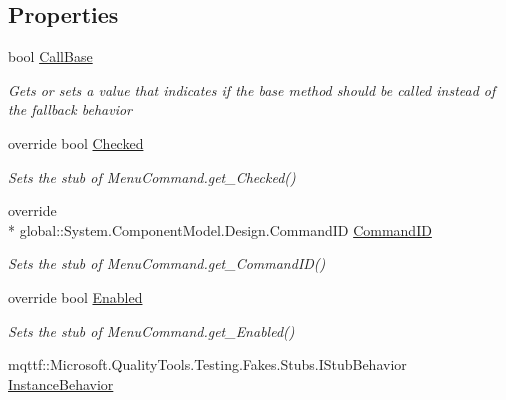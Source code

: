 \subsection*{Properties}
\begin{DoxyCompactItemize}
\item 
bool \hyperlink{class_system_1_1_component_model_1_1_design_1_1_fakes_1_1_stub_menu_command_af43b61c0740e5f5e114aba35d371b08c}{Call\-Base}
\begin{DoxyCompactList}\small\item\em Gets or sets a value that indicates if the base method should be called instead of the fallback behavior\end{DoxyCompactList}\item 
override bool \hyperlink{class_system_1_1_component_model_1_1_design_1_1_fakes_1_1_stub_menu_command_a299c1025a63b471575ad66e06509af09}{Checked}
\begin{DoxyCompactList}\small\item\em Sets the stub of Menu\-Command.\-get\-\_\-\-Checked()\end{DoxyCompactList}\item 
override \\*
global\-::\-System.\-Component\-Model.\-Design.\-Command\-I\-D \hyperlink{class_system_1_1_component_model_1_1_design_1_1_fakes_1_1_stub_menu_command_a0f61db9b9e76dc0a046ef90fb6071992}{Command\-I\-D}
\begin{DoxyCompactList}\small\item\em Sets the stub of Menu\-Command.\-get\-\_\-\-Command\-I\-D()\end{DoxyCompactList}\item 
override bool \hyperlink{class_system_1_1_component_model_1_1_design_1_1_fakes_1_1_stub_menu_command_a3aed3d67b17aca46132d9aec0813aa22}{Enabled}
\begin{DoxyCompactList}\small\item\em Sets the stub of Menu\-Command.\-get\-\_\-\-Enabled()\end{DoxyCompactList}\item 
mqttf\-::\-Microsoft.\-Quality\-Tools.\-Testing.\-Fakes.\-Stubs.\-I\-Stub\-Behavior \hyperlink{class_system_1_1_component_model_1_1_design_1_1_fakes_1_1_stub_menu_command_a84ecdaf2e2fbfe766f3988857daae5a4}{Instance\-Behavior}

\end{DoxyCompactItemize}

